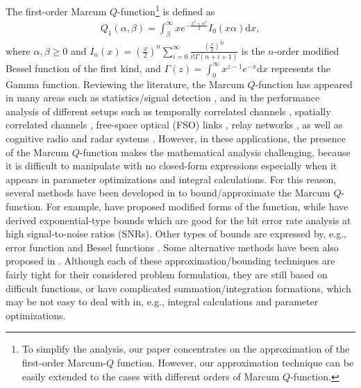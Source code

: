The first-order Marcum $Q$-function\footnote{To simplify the analysis, our paper concentrates on the approximation of the first-order Marcum-$Q$ function. However, our approximation technique can be easily extended to the cases with different orders of Marcum $Q$-function.} is defined as  \cite[Eq. (1)]{Bocus2013CLapproximation}
\begin{align}
    Q_1(\alpha,\beta) = \int_{\beta}^{\infty} xe^{-\frac{x^2+\alpha^2}{2}}I_0(x\alpha)\text{d}x,
\end{align}
where $\alpha, \beta \geq 0$ and $I_n(x) = (\frac{x}{2})^n \sum_{i=0}^{\infty}\frac{(\frac{x}{2})^{2i} }{i!\Gamma(n+i+1)}$ is the $n$-order modified Bessel function of the first kind, and $\Gamma(z) = \int_0^{\infty} x^{z-1}e^{-x} \mathrm{d}x$ represents the Gamma function. Reviewing the literature,  the Marcum $Q$-function has appeared in many areas such as statistics/signal detection \cite{helstrom1994elements}, and in the performance analysis of different setups such as temporally correlated channels \cite{Makki2013TCfeedback}, spatially correlated channels \cite{Makki2011Eurasipcapacity},  free-space optical (FSO) links \cite{Makki2018WCLwireless}, relay networks \cite{Makki2016TVTperformance}, as well as  cognitive radio and radar systems \cite{Simon2003TWCsome,Suraweera2010TVTcapacity,Kang2003JSAClargest,Chen2004TCdistribution,Ma2000JSACunified,Zhang2002TCgeneral,Ghasemi2008ICMspectrum,Digham2007TCenergy, simon2002bookdigital,Cao2016CLsolutions,sofotasios2015solutions,Cui2012ELtwo,Azari2018TCultra,Alam2014INFOCOMWrobust,Gao2018IAadmm,Shen2018TVToutage,Song2017JLTimpact,Tang2019IAan,ermolova2014laplace,peppas2013performance}. However, in these applications, the presence of the Marcum $Q$-function makes the mathematical analysis challenging, because it is  difficult to manipulate  with no closed-form  expressions especially when it appears in parameter optimizations and integral calculations. For this reason, several methods have been developed in \cite{Bocus2013CLapproximation,Fu2011GLOBECOMexponential,zhao2008ELtight,Simon2000TCexponential,annamalai2001WCMCcauchy,Sofotasios2010ISWCSnovel,Li2010TCnew,andras2011Mathematicageneralized,Gaur2003TVTsome,Kam2008TCcomputing,Corazza2002TITnew,Baricz2009TITnew,chiani1999ELintegral,jimenez2014connection}  to bound/approximate the  Marcum $Q$-function. For example, \cite{Fu2011GLOBECOMexponential,zhao2008ELtight} have proposed  modified forms of the function, while \cite{Simon2000TCexponential,annamalai2001WCMCcauchy} have derived exponential-type bounds which are good for the bit error rate analysis at high signal-to-noise ratios (SNRs). Other types of bounds are expressed by, e.g., error function \cite{Kam2008TCcomputing} and Bessel functions \cite{Corazza2002TITnew,Baricz2009TITnew,chiani1999ELintegral}. Some alternative methods have been also proposed in \cite{Sofotasios2010ISWCSnovel,Li2010TCnew,andras2011Mathematicageneralized,Bocus2013CLapproximation,Gaur2003TVTsome}. Although each of these approximation/bounding techniques are fairly tight for their considered problem formulation, they are still based on difficult functions, or have complicated summation/integration formations, which may be not easy to deal with in, e.g., integral calculations and parameter optimizations. 


